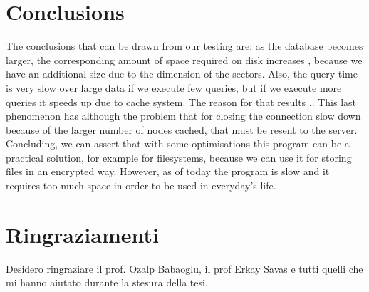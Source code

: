 \chapter{Conclusions}
The conclusions that can be drawn from our testing are:
as the database becomes larger, the corresponding amount of space required on disk increases , because we have an additional size due to the dimension of the sectors. Also, the query time is very slow over large data if we execute few queries, but if we execute more queries it speeds up due to cache system.
The reason for that results ..
This last phenomenon has although the problem that for closing the connection slow down because of the larger number of nodes cached, that must be resent to the server. %
Concluding, we can assert that with some optimisations this program can be a practical solution, for example for filesystems, because we can use it for storing files in an encrypted way. However, as of today the program is slow and it requires too much space in order to be used in everyday's life.


\chapter{Ringraziamenti}
Desidero ringraziare il prof. Ozalp Babaoglu, il prof Erkay Savas e tutti quelli che mi hanno aiutato durante la stesura della tesi.




